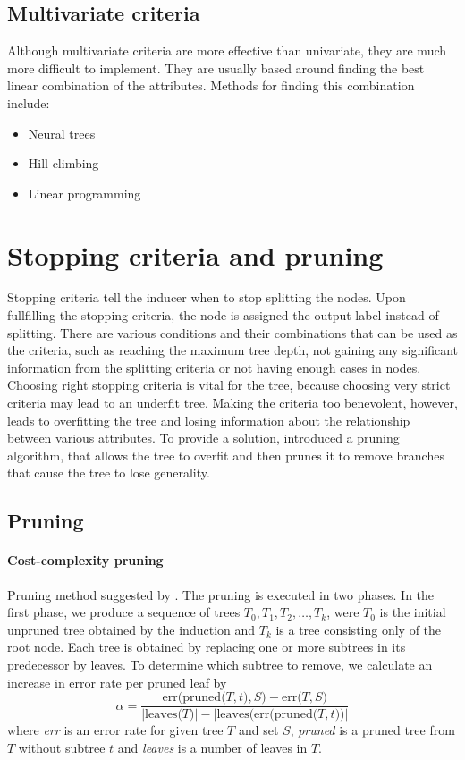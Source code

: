 \documentclass[thesis=B,english]{FITthesis}[2012/10/20]
\begin{document}
		\subsection{Multivariate criteria}
			Although multivariate criteria are more effective than univariate, they are much more difficult to implement. They are usually based around finding the best linear combination of the attributes. Methods for finding this combination include:
			\begin{itemize}
				\item Neural trees \cite{NTrees}
				\item Hill climbing \cite{CART}
				\item Linear programming
			\end{itemize}

		\section{Stopping criteria and pruning}
			Stopping criteria tell the inducer when to stop splitting the nodes. Upon fullfilling the stopping criteria, the node is assigned the output label instead of splitting. There are various conditions and their combinations that can be used as the criteria, such as reaching the maximum tree depth, not gaining any significant information from the splitting criteria or not having enough cases in nodes. Choosing right stopping criteria is vital for the tree, because choosing very strict criteria may lead to an underfit tree. Making the criteria too benevolent, however, leads to overfitting the tree and losing information about the relationship between various attributes. To provide a solution, \cite{CART} introduced a pruning algorithm, that allows the tree to overfit and then prunes it to remove branches that cause the tree to lose generality.
				
		\subsection{Pruning}
		\label{sec:pruning}
				\paragraph*{Cost-complexity pruning}

				Pruning method suggested by \cite{CART}. The pruning is executed in two phases. In the first phase, we produce a sequence of trees \(T_0, T_1, T_2, \dots, T_k \), were \(T_0\) is the initial unpruned tree obtained by the induction and \(T_k\) is a tree consisting only of the root node. Each tree is obtained by replacing one or more subtrees in its predecessor by leaves. To determine which subtree to remove, we calculate an increase in error rate per pruned leaf by 
				\[\alpha = \frac{\mathrm{err(pruned(}T,t\mathrm{)},S\mathrm{)} - \mathrm{err(}T,S\mathrm{)}}{|\mathrm{leaves(}T\mathrm{)}|-|\mathrm{leaves(}\mathrm{err(pruned(}T,t\mathrm{)}\mathrm{)}|}\]
				where \emph{err} is an error rate for given tree \(T\) and set \(S\), \emph{pruned} is a pruned tree from \(T\) without subtree \(t\) and \emph{leaves} is a number of leaves in \(T\).
\end{document}
